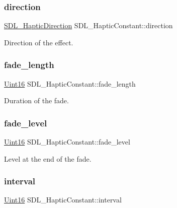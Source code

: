\subsubsection{\texorpdfstring{direction}{direction}}
{\footnotesize\ttfamily \mbox{\hyperlink{struct_s_d_l___haptic_direction}{S\+D\+L\+\_\+\+Haptic\+Direction}} S\+D\+L\+\_\+\+Haptic\+Constant\+::direction}

Direction of the effect. \mbox{\label{struct_s_d_l___haptic_constant_a647a6b761ac6ba16160d0892a12806bc}} 
\subsubsection{\texorpdfstring{fade\+\_\+length}{fade\_length}}
{\footnotesize\ttfamily \mbox{\hyperlink{_s_d_l__stdinc_8h_a31fcc0a076c9068668173ee26d33e42b}{Uint16}} S\+D\+L\+\_\+\+Haptic\+Constant\+::fade\+\_\+length}

Duration of the fade. \mbox{\label{struct_s_d_l___haptic_constant_a49f6499c89f3e494efbe92f12277c949}} 
\subsubsection{\texorpdfstring{fade\+\_\+level}{fade\_level}}
{\footnotesize\ttfamily \mbox{\hyperlink{_s_d_l__stdinc_8h_a31fcc0a076c9068668173ee26d33e42b}{Uint16}} S\+D\+L\+\_\+\+Haptic\+Constant\+::fade\+\_\+level}

Level at the end of the fade. \mbox{\label{struct_s_d_l___haptic_constant_ab1f7f0df856f4cf1fdf937cb886226b4}} 
\subsubsection{\texorpdfstring{interval}{interval}}
{\footnotesize\ttfamily \mbox{\hyperlink{_s_d_l__stdinc_8h_a31fcc0a076c9068668173ee26d33e42b}{Uint16}} S\+D\+L\+\_\+\+Haptic\+Constant\+::interval}

